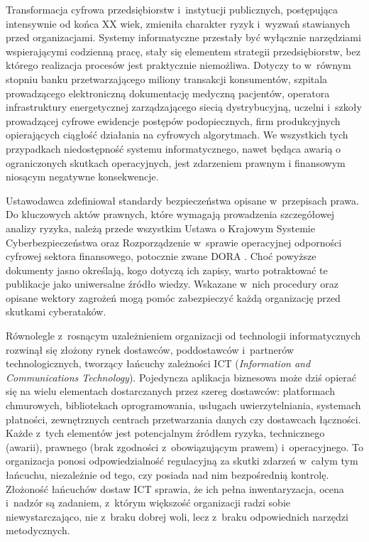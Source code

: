 Transformacja cyfrowa przedsiębiorstw i~instytucji publicznych, postępująca intensywnie od końca XX wiek,  zmieniła charakter ryzyk i~wyzwań stawianych przed organizacjami. Systemy informatyczne przestały być wyłącznie narzędziami wspierającymi codzienną pracę, stały się elementem strategii przedsiębiorstw, bez którego realizacja procesów jest praktycznie niemożliwa. Dotyczy to w~równym stopniu banku przetwarzającego miliony transakcji konsumentów, szpitala prowadzącego elektroniczną dokumentację medyczną pacjentów, operatora infrastruktury energetycznej zarządzającego siecią dystrybucyjną, uczelni i~szkoły prowadzącej cyfrowe ewidencje postępów podopiecznych, firm produkcyjnych opierających ciągłość działania na cyfrowych algorytmach. We wszystkich tych przypadkach niedostępność systemu informatycznego, nawet będąca awarią o ograniczonych skutkach operacyjnych, jest zdarzeniem prawnym i finansowym niosącym negatywne konsekwencje.

Ustawodawca zdefiniował standardy bezpieczeństwa opisane w~przepisach prawa. Do kluczowych aktów prawnych, które wymagają prowadzenia szczegółowej analizy ryzyka, należą przede wszystkim Ustawa o Krajowym Systemie Cyberbezpieczeństwa \autocite{uksc2018} oraz Rozporządzenie w~sprawie operacyjnej odporności cyfrowej sektora finansowego, potocznie zwane DORA \autocite{dora2022}. Choć powyższe dokumenty jasno określają, kogo dotyczą ich zapisy, warto potraktować te publikacje jako uniwersalne źródło wiedzy. Wskazane w~nich procedury oraz opisane wektory zagrożeń mogą pomóc zabezpieczyć każdą organizację przed skutkami cyberataków.

Równolegle z~rosnącym uzależnieniem organizacji od technologii informatycznych rozwinął się złożony rynek dostawców, poddostawców i~partnerów technologicznych, tworzący łańcuchy zależności ICT (\textit{Information and Communications Technology}). Pojedyncza aplikacja biznesowa może dziś opierać się na wielu elementach dostarczanych przez szereg dostawców: platformach chmurowych, bibliotekach oprogramowania, usługach uwierzytelniania, systemach płatności, zewnętrznych centrach przetwarzania danych czy dostawcach łączności. Każde z~tych elementów jest potencjalnym źródłem ryzyka, technicznego (awarii), prawnego (brak zgodności z~obowiązującym prawem) i~operacyjnego. To organizacja ponosi odpowiedzialność regulacyjną za skutki zdarzeń w~całym tym łańcuchu, niezależnie od tego, czy posiada nad nim bezpośrednią kontrolę. Złożoność łańcuchów dostaw ICT sprawia, że ich pełna inwentaryzacja, ocena i~nadzór są zadaniem, z~którym większość organizacji radzi sobie niewystarczająco,  nie z~braku dobrej woli, lecz z~braku odpowiednich narzędzi metodycznych.

